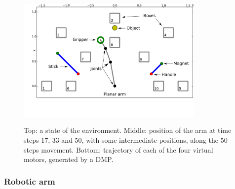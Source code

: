 \documentclass[10pt,letterpaper]{article}
\begin{document}
		\begin{figure}[h]
			\centering
			\hspace{-0.73cm}
			\vspace{-1.31cm}
			\includegraphics[width=9.12cm]{./include/tools.pdf}
			\\
			\hspace{-0.42cm}
			\caption{Top: a state of the environment. Middle: position of the arm at time steps $17$, $33$ and $50$,  with some intermediate positions, along the $50$ steps movement. Bottom: trajectory of each of the four virtual motors, generated by a DMP.}
			\label{env}
		\end{figure}

		\subsubsection{Robotic arm}
		
\end{document}

